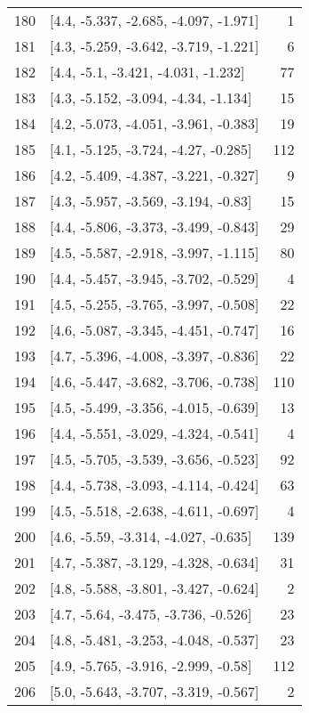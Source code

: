 \documentclass{article}%
\begin{document}
\begin{longtable}{llr}
180 &  [4.4, -5.337, -2.685, -4.097, -1.971] &       1 \\
181 &  [4.3, -5.259, -3.642, -3.719, -1.221] &       6 \\
182 &    [4.4, -5.1, -3.421, -4.031, -1.232] &      77 \\
183 &   [4.3, -5.152, -3.094, -4.34, -1.134] &      15 \\
184 &  [4.2, -5.073, -4.051, -3.961, -0.383] &      19 \\
185 &   [4.1, -5.125, -3.724, -4.27, -0.285] &     112 \\
186 &  [4.2, -5.409, -4.387, -3.221, -0.327] &       9 \\
187 &   [4.3, -5.957, -3.569, -3.194, -0.83] &      15 \\
188 &  [4.4, -5.806, -3.373, -3.499, -0.843] &      29 \\
189 &  [4.5, -5.587, -2.918, -3.997, -1.115] &      80 \\
190 &  [4.4, -5.457, -3.945, -3.702, -0.529] &       4 \\
191 &  [4.5, -5.255, -3.765, -3.997, -0.508] &      22 \\
192 &  [4.6, -5.087, -3.345, -4.451, -0.747] &      16 \\
193 &  [4.7, -5.396, -4.008, -3.397, -0.836] &      22 \\
194 &  [4.6, -5.447, -3.682, -3.706, -0.738] &     110 \\
195 &  [4.5, -5.499, -3.356, -4.015, -0.639] &      13 \\
196 &  [4.4, -5.551, -3.029, -4.324, -0.541] &       4 \\
197 &  [4.5, -5.705, -3.539, -3.656, -0.523] &      92 \\
198 &  [4.4, -5.738, -3.093, -4.114, -0.424] &      63 \\
199 &  [4.5, -5.518, -2.638, -4.611, -0.697] &       4 \\
200 &   [4.6, -5.59, -3.314, -4.027, -0.635] &     139 \\
201 &  [4.7, -5.387, -3.129, -4.328, -0.634] &      31 \\
202 &  [4.8, -5.588, -3.801, -3.427, -0.624] &       2 \\
203 &   [4.7, -5.64, -3.475, -3.736, -0.526] &      23 \\
204 &  [4.8, -5.481, -3.253, -4.048, -0.537] &      23 \\
205 &   [4.9, -5.765, -3.916, -2.999, -0.58] &     112 \\
206 &  [5.0, -5.643, -3.707, -3.319, -0.567] &       2 \\

\end{longtable}
\end{document}

